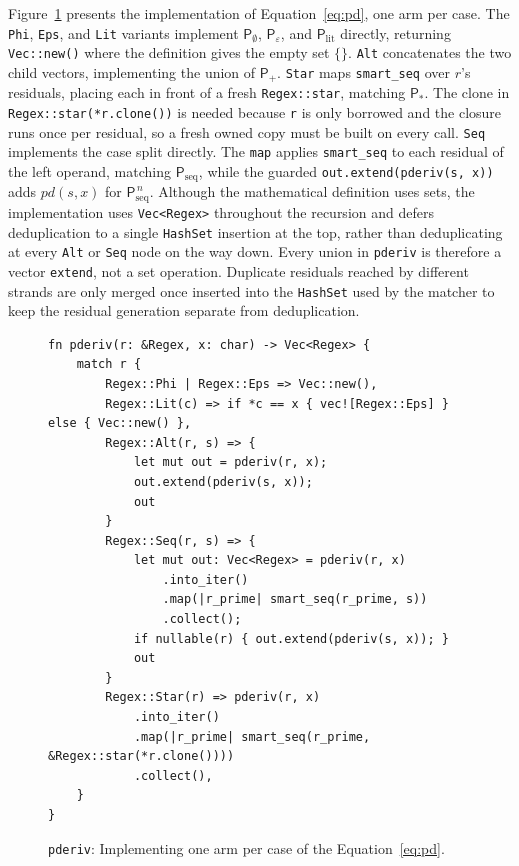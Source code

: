 Figure~\ref{fig:pderiv-rust} presents the implementation 
of Equation~\eqref{eq:pd}, one arm per case.  
The \texttt{Phi}, \texttt{Eps}, and \texttt{Lit} variants implement 
$\mathsf{P}_{\emptyset}$, $\mathsf{P}_{\varepsilon}$, 
and $\mathsf{P}_{\mathrm{lit}}$  directly, 
returning \texttt{Vec::new()} where the definition gives the empty set $\{\}$. 
\texttt{Alt} concatenates the two child vectors, 
implementing the union of $\mathsf{P}_{+}$. 
\texttt{Star} maps \texttt{smart\_seq} over $r$'s residuals,
placing each in front of a fresh \texttt{Regex::star}, 
matching $\mathsf{P}_{*}$. 
The clone in \texttt{Regex::star(*r.clone())} 
is needed because \texttt{r} is only borrowed 
and the closure runs once per residual, 
so a fresh owned copy must be built on every call.
\texttt{Seq} implements the case split directly.
The \texttt{map} applies \texttt{smart\_seq} to each residual of the left operand,
matching $\mathsf{P}_{\mathrm{seq}}$, 
while the guarded \texttt{out.extend(pderiv(s, x))} adds $pd(s,x)$ 
for $\mathsf{P}_{\mathrm{seq}}^{\,n}$.
Although the mathematical definition uses sets, 
the implementation uses \texttt{Vec<Regex>} 
throughout the recursion and defers deduplication 
to a single \texttt{HashSet} insertion at the top, 
rather than deduplicating at every \texttt{Alt} 
or \texttt{Seq} node on the way down.
Every union in \texttt{pderiv} is therefore a vector \texttt{extend}, 
not a set operation. 
Duplicate residuals reached by different strands are only merged 
once inserted into the \texttt{HashSet} 
used by the matcher to keep the residual generation separate from deduplication.

\begin{figure}[H]
\small
\begin{verbatim}
fn pderiv(r: &Regex, x: char) -> Vec<Regex> {
    match r {
        Regex::Phi | Regex::Eps => Vec::new(),
        Regex::Lit(c) => if *c == x { vec![Regex::Eps] } else { Vec::new() },
        Regex::Alt(r, s) => {
            let mut out = pderiv(r, x);
            out.extend(pderiv(s, x));
            out
        }
        Regex::Seq(r, s) => {
            let mut out: Vec<Regex> = pderiv(r, x)
                .into_iter()
                .map(|r_prime| smart_seq(r_prime, s))
                .collect();
            if nullable(r) { out.extend(pderiv(s, x)); }
            out
        }
        Regex::Star(r) => pderiv(r, x)
            .into_iter()
            .map(|r_prime| smart_seq(r_prime, &Regex::star(*r.clone())))
            .collect(),
    }
}
\end{verbatim}
\caption{\texttt{pderiv}: Implementing one arm per case of the Equation~\eqref{eq:pd}.}
\label{fig:pderiv-rust}
\end{figure}

